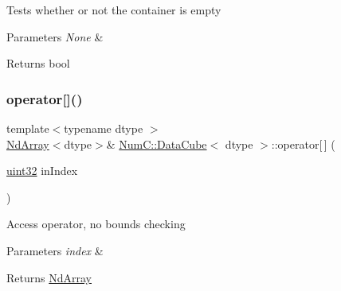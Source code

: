 Tests whether or not the container is empty


\begin{DoxyParams}{Parameters}
{\em None} & \\
\hline
\end{DoxyParams}
\begin{DoxyReturn}{Returns}
bool 
\end{DoxyReturn}
\mbox{\label{class_num_c_1_1_data_cube_ab597af34271cd67d79bd1e9dd2305cf3}} 
\subsubsection{\texorpdfstring{operator[]()}{operator[]()}\hspace{0.1cm}{\footnotesize\ttfamily [1/2]}}
{\footnotesize\ttfamily template$<$typename dtype $>$ \\
\mbox{\hyperlink{class_num_c_1_1_nd_array}{Nd\+Array}}$<$dtype$>$\& \mbox{\hyperlink{class_num_c_1_1_data_cube}{Num\+C\+::\+Data\+Cube}}$<$ dtype $>$\+::operator\mbox{[}$\,$\mbox{]} (\begin{DoxyParamCaption}\item[{\mbox{\hyperlink{namespace_num_c_ae685802ca6d3035f2b400b081e3953fa}{uint32}}}]{in\+Index }\end{DoxyParamCaption})\hspace{0.3cm}{\ttfamily [inline]}}

Access operator, no bounds checking


\begin{DoxyParams}{Parameters}
{\em index} & \\
\hline
\end{DoxyParams}
\begin{DoxyReturn}{Returns}
\mbox{\hyperlink{class_num_c_1_1_nd_array}{Nd\+Array}} 
\end{DoxyReturn}
\mbox{\label{class_num_c_1_1_data_cube_a147e32ef2549de0cdb946eebaf624b9d}} 
